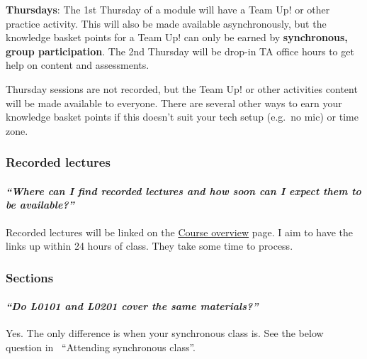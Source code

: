 \documentclass[
  openany]{book}
\begin{document}
\textbf{Thursdays}: The 1st Thursday of a module will have a Team Up! or other practice activity. This will also be made available asynchronously, but the knowledge basket points for a Team Up! can only be earned by \textbf{synchronous, group participation}. The 2nd Thursday will be drop-in TA office hours to get help on content and assessments.

Thursday sessions are not recorded, but the Team Up! or other activities content will be made available to everyone. There are several other ways to earn your knowledge basket points if this doesn't suit your tech setup (e.g.~no mic) or time zone.

\hypertarget{recorded-lectures}{%
\subsubsection{Recorded lectures}\label{recorded-lectures}}

\hypertarget{where-can-i-find-recorded-lectures-and-how-soon-can-i-expect-them-to-be-available}{%
\paragraph{\texorpdfstring{\emph{``Where can I find recorded lectures and how soon can I expect them to be available?''}}{``Where can I find recorded lectures and how soon can I expect them to be available?''}}\label{where-can-i-find-recorded-lectures-and-how-soon-can-i-expect-them-to-be-available}}

Recorded lectures will be linked on the \href{https://q.utoronto.ca/courses/253305/pages/course-overview}{Course overview} page. I aim to have the links up within 24 hours of class. They take some time to process.

\hypertarget{sections}{%
\subsubsection{Sections}\label{sections}}

\hypertarget{do-l0101-and-l0201-cover-the-same-materials}{%
\paragraph{\texorpdfstring{\emph{``Do L0101 and L0201 cover the same materials?''}}{``Do L0101 and L0201 cover the same materials?''}}\label{do-l0101-and-l0201-cover-the-same-materials}}

Yes. The only difference is when your synchronous class is. See the below question in~ ``Attending synchronous class''.
\end{document}

